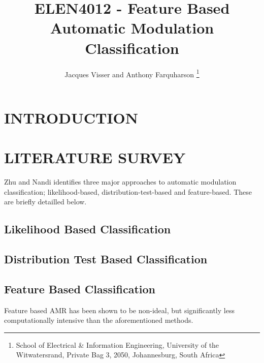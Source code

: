 \documentclass[10pt,twocolumn]{witseiepaper}
\begin{document}
\title{ELEN4012 - Feature Based Automatic Modulation Classification}

\author{Jacques Visser and Anthony Farquharson
\thanks{School of Electrical \& Information Engineering, University of the
Witwatersrand, Private Bag 3, 2050, Johannesburg, South Africa}
}



\maketitle
\thispagestyle{empty}\pagestyle{empty}

\section{INTRODUCTION}

\section{LITERATURE SURVEY}
Zhu and Nandi \cite{zhu2014automatic} identifies three major approaches to automatic modulation classification; likelihood-based, distribution-test-based and feature-based. These are briefly detailled below.
	\subsection{Likelihood Based Classification}
	\subsection{Distribution Test Based Classification}
	\subsection{Feature Based Classification}
	\label{sec:features}
	Feature based AMR has been shown to be non-ideal, but significantly less computationally intensive \cite{zhu2014automatic} than the aforementioned methods.
\end{document}
